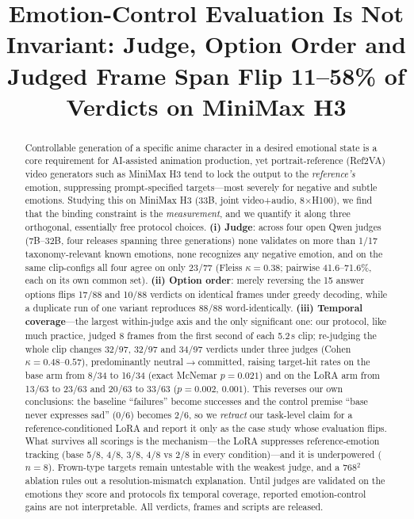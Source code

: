 \documentclass[conference]{IEEEtran}
\title{Emotion-Control Evaluation Is Not Invariant: Judge, Option Order and
Judged Frame Span Flip 11--58\% of Verdicts on MiniMax H3}
\author{\IEEEauthorblockN{Anonymous}}
\begin{document}
\maketitle

\begin{abstract}
Controllable generation of a specific anime character in a desired emotional state is a core
requirement for AI-assisted animation production, yet portrait-reference (Ref2VA) video
generators such as MiniMax H3 tend to lock the output to the \emph{reference's} emotion,
suppressing prompt-specified targets---most severely for negative and subtle emotions. Studying this
on MiniMax H3 (33B, joint video+audio, 8$\times$H100), we find that the binding constraint is the
\emph{measurement}, and we quantify it along three orthogonal, essentially free protocol choices.
\textbf{(i) Judge}: across four open Qwen judges (7B--32B, four releases spanning three generations) none validates on more
than 1/17 taxonomy-relevant known emotions, none recognizes any negative emotion, and on the same
clip-configs all four agree on only 23/77 (Fleiss $\kappa{=}0.38$; pairwise 41.6--71.6\%, each on its own common set).
\textbf{(ii) Option order}: merely reversing the 15 answer options flips 17/88 and 10/88 verdicts on
identical frames under greedy decoding, while a duplicate run of one variant reproduces 88/88 word-identically. \textbf{(iii) Temporal
coverage}---the largest within-judge axis and the only significant one: our protocol, like much practice,
judged 8 frames from the first second of each 5.2\,s clip; re-judging the whole clip changes 32/97, 32/97 and 34/97
verdicts under three judges (Cohen $\kappa{=}0.48$--$0.57$), predominantly
neutral$\rightarrow$committed, raising target-hit rates on the base arm from 8/34 to 16/34 (exact
McNemar $p{=}0.021$) and on the LoRA arm from 13/63 to 23/63 and 20/63 to 33/63 ($p{=}0.002$, $0.001$). This
reverses our own conclusions: the baseline ``failures'' become successes and the control premise
``base never expresses sad'' (0/6) becomes 2/6, so we \emph{retract} our task-level claim for a
reference-conditioned LoRA and report it only as the case study whose evaluation flips. What survives
all scorings is the mechanism---the LoRA suppresses reference-emotion tracking (base 5/8, 4/8, 3/8,
4/8 vs 2/8 in every condition)---and it is underpowered ($n{=}8$). Frown-type targets remain
untestable with the weakest judge, and a 768$^2$ ablation rules out a resolution-mismatch
explanation. Until judges are validated on the emotions they score and protocols fix temporal
coverage, reported emotion-control gains are not interpretable. All verdicts, frames and scripts
are released.
\end{abstract}
\end{document}
